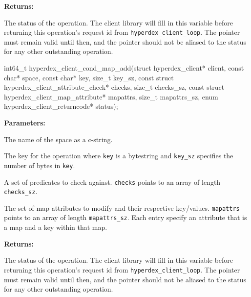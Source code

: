 \noindent\textbf{Returns:}
\begin{description}[labelindent=\widthof{{\texttt{status}}},leftmargin=*,noitemsep,nolistsep,align=right]
\item[\texttt{status}] The status of the operation.  The client library will fill in this variable before returning this operation's request id from \texttt{hyperdex\_client\_loop}.  The pointer must remain valid until then, and the pointer should not be aliased to the status for any other outstanding operation.
\end{description}

\funcsep
\begin{ccode}
int64_t hyperdex_client_cond_map_add(struct hyperdex_client* client,
                const char* space,
                const char* key, size_t key_sz,
                const struct hyperdex_client_attribute_check* checks, size_t checks_sz,
                const struct hyperdex_client_map_attribute* mapattrs, size_t mapattrs_sz,
                enum hyperdex_client_returncode* status);
\end{ccode}
\funcdesc 

\noindent\textbf{Parameters:}
\begin{description}[labelindent=\widthof{{\texttt{mapattrs}, \texttt{mapattrs\_sz}}},leftmargin=*,noitemsep,nolistsep,align=right]
\item[\texttt{space}] The name of the space as a c-string.
\item[\texttt{key}, \texttt{key\_sz}] The key for the operation where \texttt{key} is a bytestring and \texttt{key\_sz} specifies the number of bytes in \texttt{key}.
\item[\texttt{checks}, \texttt{checks\_sz}] A set of predicates to check against.  \texttt{checks} points to an array of length \texttt{checks\_sz}.
\item[\texttt{mapattrs}, \texttt{mapattrs\_sz}] The set of map attributes to modify and their respective key/values.  \texttt{mapattrs} points to an array of length \texttt{mapattrs\_sz}.  Each entry specify an attribute that is a map and a key within that map.
\end{description}

\noindent\textbf{Returns:}
\begin{description}[labelindent=\widthof{{\texttt{status}}},leftmargin=*,noitemsep,nolistsep,align=right]
\item[\texttt{status}] The status of the operation.  The client library will fill in this variable before returning this operation's request id from \texttt{hyperdex\_client\_loop}.  The pointer must remain valid until then, and the pointer should not be aliased to the status for any other outstanding operation.
\end{description}

